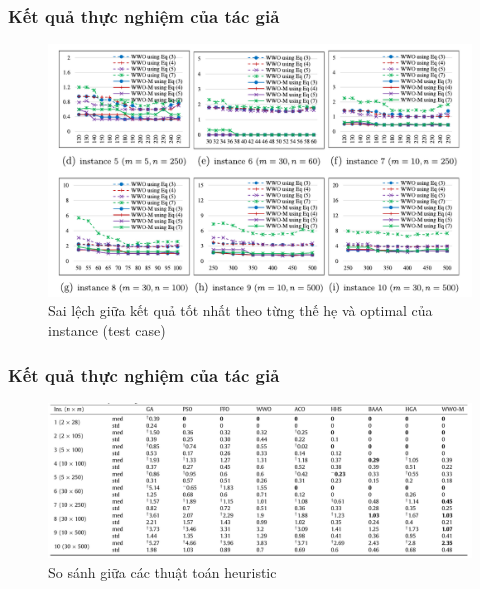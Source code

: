 \begin{frame}
    \frametitle{Kết quả thực nghiệm của tác giả}
    \begin{figure}
        \centering
        \includegraphics[width=0.7\linewidth]{images/author-mkp-rpd.png}
        \caption{Sai lệch giữa kết quả tốt nhất theo từng thế hẹ và optimal của instance (test case)\cite{zheng2019water}}
        \label{fig:author-mkp-rpd}
    \end{figure}
\end{frame}

\begin{frame}
    \frametitle{Kết quả thực nghiệm của tác giả}
    \begin{figure}
        \centering
        \includegraphics[width=1\linewidth]{images/authors-mkp.png}
        \caption{So sánh giữa các thuật toán heuristic \cite{zheng2019water}}
        \label{fig:authors-mkp}
    \end{figure}
\end{frame}


